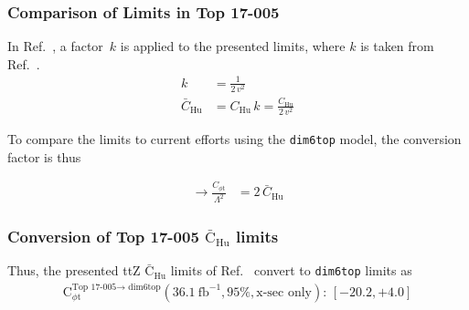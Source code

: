 \documentclass[letterpaper,11pt]{article}
\begin{document}
\subsubsection{Comparison of Limits in Top 17-005}

In Ref.~\cite{Sirunyan:2017uzs}, a factor~$k$ is applied to the presented limits, where $k$ is taken from Ref.~\cite{annawoodardgithub}.  %
\begin{align}
k &= \frac{1}{2\,v^2}\\
\bar{C}_\text{Hu} &= C_\text{Hu}\,k = \frac{C_\text{Hu}}{2\,v^2}
\end{align}

\noindent
To compare the limits to current efforts using the \texttt{dim6top} model, the conversion factor is thus

\begin{align}
\rightarrow \frac{C_{\phi\text{t}}}{\Lambda^2} &= 2\,\bar{C}_\text{Hu}
\end{align}

\noindent
{}

\subsubsection{Conversion of Top 17-005 $\bar{\text{C}}_\text{Hu}$ limits}
Thus, the presented ttZ $\bar{\text{C}}_\text{Hu}$ limits of Ref.~\cite{Sirunyan:2017uzs} convert to \texttt{dim6top} limits as
\begin{align}
\text{C}_{\phi\text{t}}^\text{Top 17-005$\rightarrow$ dim6top}(36.1~\text{fb}^{-1}, 95\%, \text{x-sec only}):\, [-20.2, +4.0]
\end{align}
\end{document}
